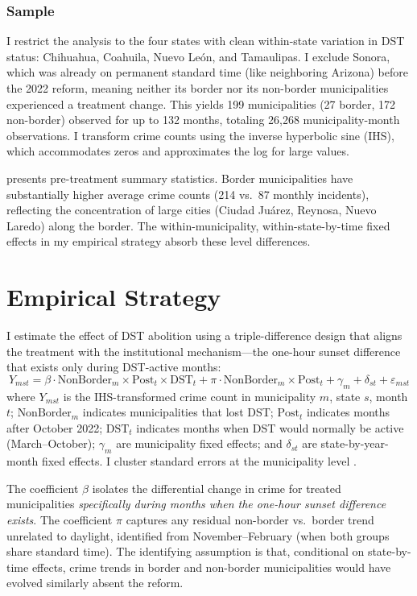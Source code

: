 \documentclass[12pt]{article}
\begin{document}
\subsubsection*{Sample} I restrict the analysis to the four states with clean within-state variation in DST status: Chihuahua, Coahuila, Nuevo Le\'on, and Tamaulipas. I exclude Sonora, which was already on permanent standard time (like neighboring Arizona) before the 2022 reform, meaning neither its border nor its non-border municipalities experienced a treatment change. This yields 199 municipalities (27 border, 172 non-border) observed for up to 132 months, totaling 26,268 municipality-month observations. I transform crime counts using the inverse hyperbolic sine (IHS), which accommodates zeros and approximates the log for large values.



 presents pre-treatment summary statistics. Border municipalities have substantially higher average crime counts (214 vs.\ 87 monthly incidents), reflecting the concentration of large cities (Ciudad Ju\'arez, Reynosa, Nuevo Laredo) along the border. The within-municipality, within-state-by-time fixed effects in my empirical strategy absorb these level differences.

\section{Empirical Strategy}

I estimate the effect of DST abolition using a triple-difference design that aligns the treatment with the institutional mechanism---the one-hour sunset difference that exists only during DST-active months:
\begin{equation}\label{eq:main}
Y_{mst} = \beta \cdot \text{NonBorder}_m \times \text{Post}_t \times \text{DST}_t + \pi \cdot \text{NonBorder}_m \times \text{Post}_t + \gamma_m + \delta_{st} + \varepsilon_{mst}
\end{equation}
where $Y_{mst}$ is the IHS-transformed crime count in municipality $m$, state $s$, month $t$; $\text{NonBorder}_m$ indicates municipalities that lost DST; $\text{Post}_t$ indicates months after October 2022; $\text{DST}_t$ indicates months when DST would normally be active (March--October); $\gamma_m$ are municipality fixed effects; and $\delta_{st}$ are state-by-year-month fixed effects. I cluster standard errors at the municipality level \citep{cameron2015}.

The coefficient $\beta$ isolates the differential change in crime for treated municipalities \textit{specifically during months when the one-hour sunset difference exists}. The coefficient $\pi$ captures any residual non-border vs.\ border trend unrelated to daylight, identified from November--February (when both groups share standard time). The identifying assumption is that, conditional on state-by-time effects, crime trends in border and non-border municipalities would have evolved similarly absent the reform.
\end{document}
